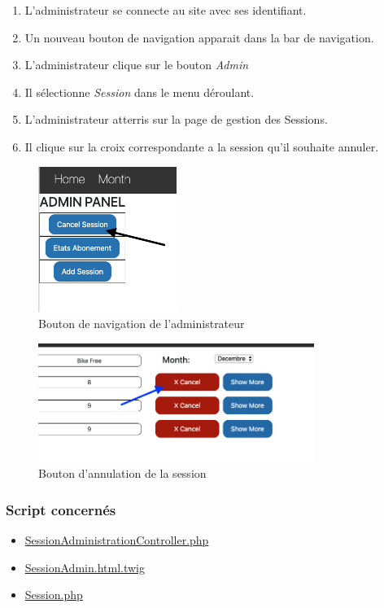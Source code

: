 \begin{enumerate}
	\item L'administrateur se connecte au site avec ses identifiant. 
	\item Un nouveau bouton de navigation apparait dans la bar de navigation. 
	\item L'administrateur clique sur le bouton \textit{Admin}
	\item Il sélectionne \textit{Session} dans le menu déroulant. 
	\item L'administrateur atterris sur la page de gestion des Sessions. 
	\item Il clique sur la croix correspondante a la session qu'il souhaite annuler. 
\end{enumerate}

\newpage
\begin{figure}[h]
	\includegraphics[width=0.4\textwidth,center]{Figures/us9-1}
	\caption{Bouton de navigation de l'administrateur}
\end{figure}

\vspace{\baselineskip}
\begin{figure}[h]
	\includegraphics[width=0.8\textwidth,center]{Figures/us9-2}
	\caption{Bouton d'annulation de la session}
\end{figure}


\vspace{\baselineskip}
\subsubsection{Script concernés}
	\begin{itemize}
		\item \href{https://github.com/victorsmits/Aquabike/blob/master/backend/src/Controller/SessionAdministrationController.php}{SessionAdministrationController.php}
		\item \href{https://github.com/victorsmits/Aquabike/blob/master/backend/templates/registration/SessionAdmin.html.twig}{SessionAdmin.html.twig}
		\item \href{https://github.com/victorsmits/Aquabike/blob/master/backend/src/Entity/Session.php}{Session.php}
	\end{itemize}
